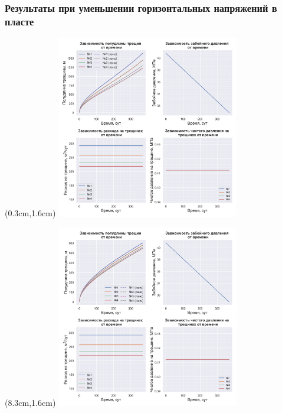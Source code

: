 \documentclass{beamer}
\begin{document}
\begin{frame}
\frametitle{Результаты при уменьшении горизонтальных напряжений в пласте}

\begin{textblock*}{8cm}(0.3cm,1.6cm)
\includegraphics[width=8cm]{myimage11.jpg}
\end{textblock*}

\begin{textblock*}{8cm}(8.3cm,1.6cm)
%
  {\includegraphics[width=8cm]{myimage12.jpg}}
\end{textblock*}

\end{frame}
\end{document}
